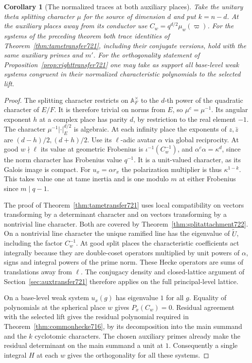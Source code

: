 \documentclass[a4paper,11pt]{article}
\newtheorem{corollary}[proposition]{Corollary}
\theoremstyle{definition}
\theoremstyle{remark}
\numberwithin{equation}{section}
\begin{document}
\begin{corollary}[The normalized traces at both auxiliary places]
\leavevmode\label{cor:normalizedtransfer722}
Take the unitary theta splitting character \(\mu\) for the
source of dimension \(d\) and put \(k=n-d\). At the auxiliary
places away from its conductor use
\(C_w=q^{d/2}\mu_w(\varpi)\).
For the systems of the preceding theorem both trace identities
of Theorem~\ref{thm:tametransfer721}, including their conjugate
versions, hold with the same auxiliary primes and \(m'\).
For the orthogonality statement of
Proposition~\ref{prop:righttransfer721} one may take as support
all base-level weak systems congruent in their normalized
characteristic polynomials to the selected lift.
\end{corollary}
\begin{proof}
The splitting character restricts on \(\mathbb A_F^\times\)
to the \(d\)-th power of the quadratic character of \(E/F\).
It is therefore trivial on norms from \(E\), so \(\mu^c=\mu^{-1}\).
Its angular exponent \(h\) at a complex place has parity \(d\),
by restriction to the real element \(-1\).
The character \(\mu^{-1}|\cdot|_E^{d/2}\) is algebraic. At
each infinity place the exponents of \(z,\bar z\) are
\((d-h)/2,(d+h)/2\). Use its \(\ell\)-adic avatar \(\alpha\)
via global reciprocity. At good \(w\nmid\ell\) its value at
geometric Frobenius is \(\iota^{-1}(C_w^{-1})\), and
\(\alpha^c\alpha=\kappa^d\), since the norm character has
Frobenius value \(q^{-1}\). It is a unit-valued character,
as its Galois image is compact. For \(u_x=\alpha r_x\) the
polarization multiplier is thus \(\kappa^{1-k}\). This takes
value one at tame inertia and is one modulo \(m\) at either
Frobenius since \(m\mid q-1\).

The proof of Theorem~\ref{thm:tametransfer721} uses local
compatibility on vectors transforming by a determinant character
and on vectors transforming by a nontrivial line character.
Both are covered by Theorem~\ref{thm:splitattachment722}. On
a nontrivial line character the unique ramified line has the
eigenvalue of \(\widetilde U\), including the factor \(C_w^{-1}\).
At good split places the characteristic coefficients act
integrally because they are double-coset operators multiplied
by unit powers of \(\alpha\), signs and integral powers of
the prime norm. These Hecke operators are sums of translations
away from \(\ell\). The conjugacy density and closed-lattice
argument of Section~\ref{sec:auxtransfer721} therefore applies
on the full principal-level lattice.

On a base-level weak system \(u_x(g)\) has eigenvalue \(1\)
for all \(g\). Equality of polynomials at the spherical place
\(w\) gives \(P_x(C_w)=0\). Residual agreement with the
selected lift gives the residual polynomial required in
Theorem~\ref{thm:commonhecke716}, by its decomposition into
the main summand and the \(k\) cyclotomic characters.
The chosen auxiliary primes already make the residual
determinant on the main summand a unit at \(1\).
Consequently a single integral \(H\) at each \(w\) gives the
orthogonality for all these systems.
\end{proof}
\end{document}
